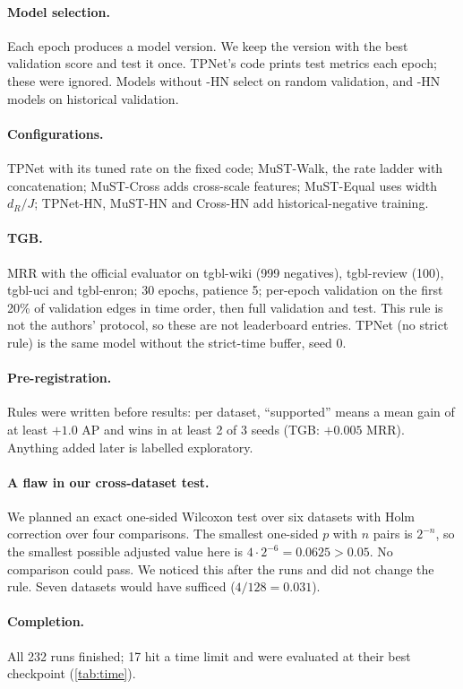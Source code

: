 \documentclass[11pt,a4paper]{article}
\theoremstyle{remark}
\begin{document}
\paragraph{Model selection.} Each epoch produces a model version. We keep the version with the best validation score and test it once. TPNet's code prints test metrics each epoch; these were ignored. Models without -HN select on random validation, and -HN models on historical validation.
\paragraph{Configurations.} TPNet with its tuned rate on the fixed code; MuST-Walk, the rate ladder with concatenation; MuST-Cross adds cross-scale features; MuST-Equal uses width $d_R/J$; TPNet-HN, MuST-HN and Cross-HN add historical-negative training.
\paragraph{TGB.} MRR with the official evaluator on tgbl-wiki (999 negatives), tgbl-review (100), tgbl-uci and tgbl-enron; 30 epochs, patience 5; per-epoch validation on the first 20\% of validation edges in time order, then full validation and test. This rule is not the authors' protocol, so these are not leaderboard entries. TPNet (no strict rule) is the same model without the strict-time buffer, seed 0.
\paragraph{Pre-registration.} Rules were written before results: per dataset, ``supported'' means a mean gain of at least $+1.0$ AP and wins in at least 2 of 3 seeds (TGB: $+0.005$ MRR). Anything added later is labelled exploratory.
\paragraph{A flaw in our cross-dataset test.} We planned an exact one-sided Wilcoxon test \cite{wilcoxon} over six datasets with Holm correction \cite{holm} over four comparisons. The smallest one-sided $p$ with $n$ pairs is $2^{-n}$, so the smallest possible adjusted value here is $4\cdot 2^{-6}=0.0625>0.05$. No comparison could pass. We noticed this after the runs and did not change the rule. Seven datasets would have sufficed ($4/128=0.031$).
\paragraph{Completion.} All 232 runs finished; 17 hit a time limit and were evaluated at their best checkpoint (\cref{tab:time}).
\end{document}
